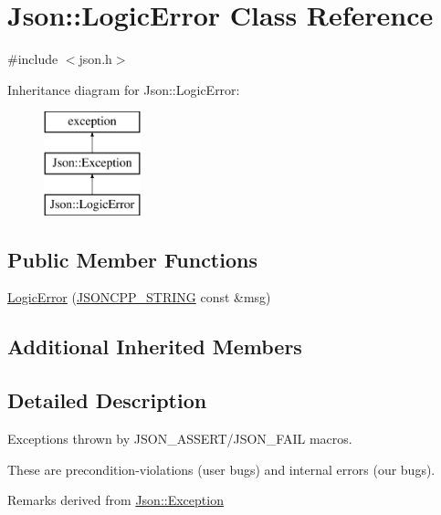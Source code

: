 \hypertarget{classJson_1_1LogicError}{}\section{Json\+:\+:Logic\+Error Class Reference}
\label{classJson_1_1LogicError}


{\ttfamily \#include $<$json.\+h$>$}

Inheritance diagram for Json\+:\+:Logic\+Error\+:\begin{figure}[H]
\begin{center}
\leavevmode
\includegraphics[height=3.000000cm]{classJson_1_1LogicError}
\end{center}
\end{figure}
\subsection*{Public Member Functions}
\begin{DoxyCompactItemize}
\item 
\hyperlink{classJson_1_1LogicError_acca679aa49768a4a1de7b705c67c2919_acca679aa49768a4a1de7b705c67c2919}{Logic\+Error} (\hyperlink{json_8h_a1e723f95759de062585bc4a8fd3fa4be_a1e723f95759de062585bc4a8fd3fa4be}{J\+S\+O\+N\+C\+P\+P\+\_\+\+S\+T\+R\+I\+NG} const \&msg)
\end{DoxyCompactItemize}
\subsection*{Additional Inherited Members}


\subsection{Detailed Description}
Exceptions thrown by J\+S\+O\+N\+\_\+\+A\+S\+S\+E\+R\+T/\+J\+S\+O\+N\+\_\+\+F\+A\+IL macros.

These are precondition-\/violations (user bugs) and internal errors (our bugs).

\begin{DoxyRemark}{Remarks}
derived from \hyperlink{classJson_1_1Exception}{Json\+::\+Exception} 
\end{DoxyRemark}


